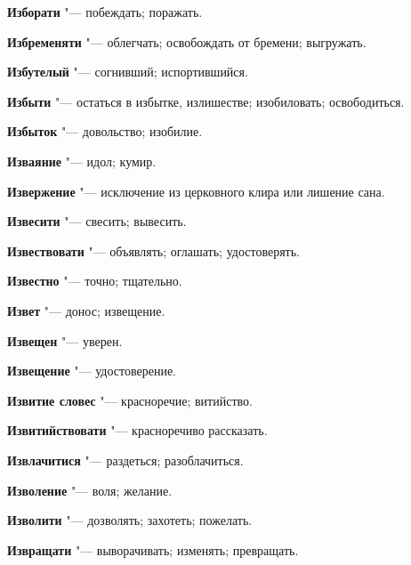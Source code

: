 \begin{mymulticols}{2}
\noindent\textbf{Изборати} "--- побеждать; поражать. 




\noindent\textbf{Избременяти} "--- облегчать; освобождать от бремени; выгружать. 




\noindent\textbf{Избутелый} "--- согнивший; испортившийся. 




\noindent\textbf{Избыти} "--- остаться в избытке, излишестве; изобиловать; освободиться. 




\noindent\textbf{Избыток} "--- довольство; изобилие. 




\noindent\textbf{Изваяние} "--- идол; кумир. 




\noindent\textbf{Извержение} "--- исключение из церковного клира или лишение сана. 




\noindent\textbf{Извесити} "--- свесить; вывесить. 




\noindent\textbf{Извествовати} "--- объявлять; оглашать; удостоверять. 




\noindent\textbf{Известно} "--- точно; тщательно. 




\noindent\textbf{Извет} "--- донос; извещение. 




\noindent\textbf{Извещен} "--- уверен. 




\noindent\textbf{Извещение} "--- удостоверение. 




\noindent\textbf{Извитие словес} "--- красноречие; витийство. 




\noindent\textbf{Извитийствовати} "--- красноречиво рассказать. 




\noindent\textbf{Извлачитися} "--- раздеться; разоблачиться. 




\noindent\textbf{Изволение} "--- воля; желание. 




\noindent\textbf{Изволити} "--- дозволять; захотеть; пожелать. 




\noindent\textbf{Извращати} "--- выворачивать; изменять; превращать. 





\end{mymulticols}
